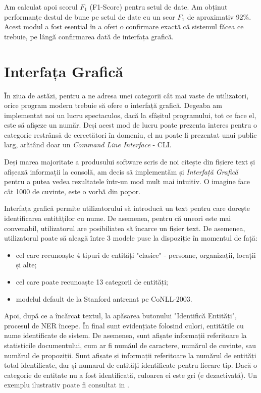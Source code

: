 Am calculat apoi scorul $F_1$ (F1-Score) pentru setul de date. Am obținut performanțe destul de bune pe setul de date cu un scor $F_1$ de aproximativ 92\%. Acest modul a fost esențial în a oferi o confirmare exactă că sistemul făcea ce trebuie, pe lângă confirmarea dată de interfața grafică.

\section{Interfața Grafică}

În ziua de astăzi, pentru a ne adresa unei categorii cât mai vaste de utilizatori, orice program modern trebuie să ofere o interfață grafică. Degeaba am implementat noi un lucru spectaculos, dacă la sfâșitul programului, tot ce face el, este să afișeze un număr. Deși acest mod de lucru poate prezenta interes pentru o categorie restrânsă de cercetători în domeniu, el nu poate fi prezentat unui public larg, arătând doar un \textit{Command Line Interface} - CLI.

Deși marea majoritate a produsului software scris de noi citește din fișiere text și afișează informații la consolă, am decis să implementăm și \textit{Interfață Grafică} pentru a putea vedea rezultatele într-un mod mult mai intuitiv. O imagine face cât 1000 
de cuvinte, este o vorbă din popor.

Interfața grafică permite utilizatorului să introducă un text pentru care dorește identificarea entităților cu nume. De asemenea, pentru că uneori este mai convenabil, utilizatorul are posibiliatea să încarce un fișier text. De asemenea, utilizatorul poate să aleagă între 3 modele puse la dispoziție în momentul de față:
\begin{itemize}
\item  cel care recunoaște 4 tipuri de entități "clasice" - persoane, organizații, locații și alte;
\item cel care poate recunoaște 13 categorii de entități;
\item modelul default de la Stanford antrenat pe CoNLL-2003.
\end{itemize}

Apoi, după ce a încărcat textul, la apăsarea butonului "Identifică Entități", procesul de NER începe. În final sunt evidențiate folosind culori, entitățile cu nume identificate de sistem. De asemenea, sunt afișate informații referitoare la statisticile documentului, cum ar fi număul de caractere, numărul de cuvinte, sau numărul de propoziții. Sunt afișate și informații referitoare la numărul de entități total identificate, dar și numarul de entități identificate pentru fiecare tip. Dacă o categorie de entitate nu a fost identificată, culoarea ei este gri (e dezactivată). Un exemplu ilustrativ poate fi consultat in .

